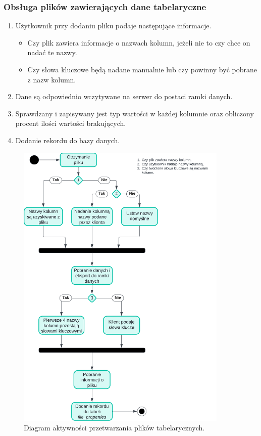 \documentclass[12pt,a4paper,twoside]{article}
\begin{document}
\subsubsection*{Obsługa plików zawierających dane tabelaryczne}
\begin{enumerate}
	\item Użytkownik przy dodaniu pliku podaje następujące informacje.
	\begin{itemize}
		\item Czy plik zawiera informacje o nazwach kolumn, jeżeli nie to czy chce on nadać te nazwy.
		\item Czy słowa kluczowe będą nadane manualnie lub czy powinny być pobrane z nazw kolumn.
	\end{itemize}
	\item Dane są odpowiednio wczytywane na serwer do postaci ramki danych.
	\item Sprawdzany i zapisywany jest typ wartości w każdej kolumnie oraz obliczony procent ilości wartości brakujących.
	\item Dodanie rekordu do bazy danych.
\end{enumerate}
\begin{figure}[h!]
\centering
  \includegraphics[width=0.9\textwidth]{img/csvac.pdf}
  \caption{Diagram aktywności przetwarzania plików tabelarycznych.}
\end{figure}
\clearpage
\newpage
\end{document}
